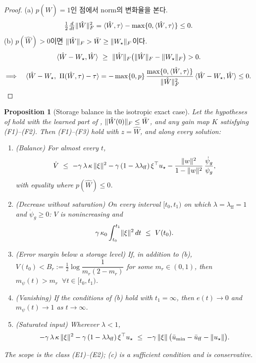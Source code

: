 \documentclass[11pt]{article}\usepackage[margin=1in]{geometry}\usepackage{amsmath,amssymb,amsthm,mathtools}\usepackage{graphicx}\graphicspath{{figures/}{../figures/}{figs/}{./}}\usepackage{enumitem}\usepackage{hyperref}\usepackage{cleveref}\usepackage{tikz}\usetikzlibrary{arrows.meta,positioning,calc,shapes.geometric}\usepackage{float}\usepackage[most]{tcolorbox}\usepackage{kotex}\usepackage{booktabs}\emergencystretch=1.6em\tolerance=2000 \crefname{assumption}{Assumption}{Assumptions}\Crefname{assumption}{Assumption}{Assumptions}\crefname{definition}{Definition}{Definitions}\Crefname{definition}{Definition}{Definitions}\crefname{proposition}{Proposition}{Propositions}\Crefname{proposition}{Proposition}{Propositions}\crefname{fact}{Fact}{Facts}\Crefname{fact}{Fact}{Facts} \newtheorem{assumption}{Assumption}\newtheorem{definition}{Definition}\newtheorem{lemma}{Lemma}\newtheorem{proposition}{Proposition}\newtheorem{theorem}{Theorem}\newtheorem{corollary}{Corollary}\newtheorem{fact}{Fact}\theoremstyle{remark}\newtheorem{remark}{Remark} \newcommand{\R}{\mathbb{R}}\newcommand{\U}{\mathcal U}
\begin{document}
\begin{proof}
(a) $p(\hat W)=1$인 점에서 norm의 변화율을 본다.
\[
\tfrac12\tfrac{d}{dt}\lVert \hat W\rVert_F^2=\langle\hat W,\tau\rangle-\max\{0,\langle\hat W,\tau\rangle\}\le0 .
\]
(b) $p(\hat W)>0$이면 $\lVert \hat W\rVert_F>\bar W\ge\lVert W_\star\rVert_F$이다.
\[
\langle\hat W-W_\star,\hat W\rangle\ \ge\ \norm{\hat W}_F\big(\norm{\hat W}_F-\norm{W_\star}_F\big)>0 .
\]
\[
\Longrightarrow\quad \langle\hat W-W_\star,\ \Pi(\hat W,\tau)-\tau\rangle=-\max\{0,p\}\,\frac{\max\{0,\langle\hat W,\tau\rangle\}}{\lVert \hat W\rVert_F^2}\,\langle\hat W-W_\star,\hat W\rangle\le0 .
\]
\end{proof}

\begin{proposition}[Storage balance in the isotropic exact case]
\label{prop:storage}
Let the hypotheses of  hold with the learned part of , $\lVert \hat W(0)\rVert_F\le\bar W$, and any gain map $K$ satisfying (F1)--(F2). Then (F1)--(F3) hold with $z=\hat W$, and along every solution:
\begin{enumerate}[label=(\alph*)]
\item (Balance) For almost every $t$,
\[
\dot V\ \le\ -\gamma\,\lambda\,\kappa\,\norm{\xi}^2-\gamma\,(1-\lambda\lambda_{\mathrm{ff}})\,\xi^\top u_\star-\frac{\norm{w}^2}{1-\norm{w}^2}\,\frac{\dot\psi_g}{\psi_g},
\]
with equality where $p(\hat W)\le0$.
\item (Decrease without saturation) On every interval $[t_0,t_1)$ on which $\lambda=\lambda_{\mathrm{ff}}=1$ and $\dot\psi_g\ge0$: $V$ is nonincreasing and
\[
\gamma\,\kappa_0\int_{t_0}^{t_1}\norm{\xi}^2\,dt\ \le\ V(t_0).
\]
\item (Error margin below a storage level) If, in addition to (b), $V(t_0)<B_r:=\tfrac12\log\dfrac{1}{m_r(2-m_r)}$ for some $m_r\in(0,1)$, then $m_\psi(t)>m_r$ $\ \forall t\in[t_0,t_1)$.
\item (Vanishing) If the conditions of (b) hold with $t_1=\infty$, then $e(t)\to0$ and $m_\psi(t)\to1$ as $t\to\infty$.
\item (Saturated input) Wherever $\lambda<1$,
\[
-\gamma\,\lambda\,\kappa\,\lVert \xi\rVert^2-\gamma\,(1-\lambda\lambda_{\mathrm{ff}})\,\xi^\top u_\star\ \le\ -\gamma\,\lVert \xi\rVert\,\big(\bar u_{\min}-\bar u_{\mathrm{ff}}-\lVert u_\star\rVert\big).
\]
\end{enumerate}
The scope is the class (E1)--(E2); (c) is a sufficient condition and is conservative.
\end{proposition}
\end{document}
